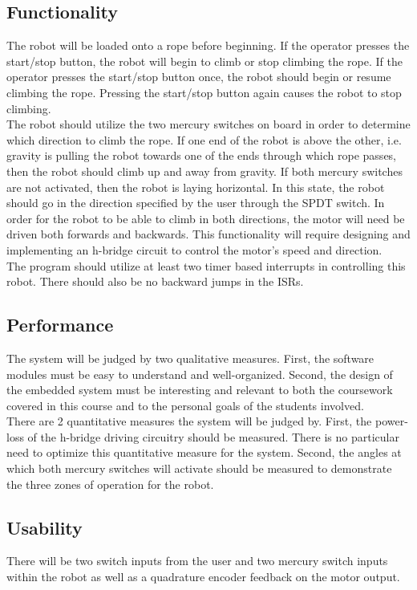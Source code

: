 \documentclass{article}
\begin{document}
	\subsection{Functionality}
		The robot will be loaded onto a rope before beginning. If the operator presses the start/stop button, the robot will begin to climb or stop climbing the rope. If the operator presses the start/stop button once, the robot should begin or resume climbing the rope. Pressing the start/stop button again causes the robot to stop climbing.\\
		The robot should utilize the two mercury switches on board in order to determine which direction to climb the rope. If one end of the robot is above the other, i.e. gravity is pulling the robot towards one of the ends through which rope passes, then the robot should climb up and away from gravity. If both mercury switches are not activated, then the robot is laying horizontal. In this state, the robot should go in the direction specified by the user through the SPDT switch. In order for the robot to be able to climb in both directions, the motor will need be driven both forwards and backwards. This functionality will require designing and implementing an h-bridge circuit to control the motor's speed and direction.\\
		The program should utilize at least two timer based interrupts in controlling this robot. There should also be no backward jumps in the ISRs.
	\subsection{Performance}
		The system will be judged by two qualitative measures. First, the software modules must be easy to understand and well-organized. Second, the design of the embedded system must be interesting and relevant to both the coursework covered in this course and to the personal goals of the students involved.\\
		There are 2 quantitative measures the system will be judged by. First, the power-loss of the h-bridge driving circuitry should be measured. There is no particular need to optimize this quantitative measure for the system. Second, the angles at which both mercury switches will activate should be measured to demonstrate the three zones of operation for the robot.
	\subsection{Usability}
		There will be two switch inputs from the user and two mercury switch inputs within the robot as well as a quadrature encoder feedback on the motor output.
\end{document}
